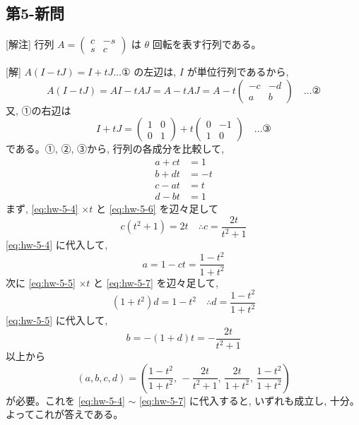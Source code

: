 \documentclass[../main.tex]{subfiles}
\begin{document}

\newpage

\subsection*{第5-新問}

[解注] 行列 $A =
\begin{pmatrix} c & -s \\ s & c
\end{pmatrix}$ は $\theta$ 回転を表す行列である。

[解] $A(I-tJ) = I+tJ \dots \text{①}$ の左辺は, $I$ が単位行列であるから,
\[
  A(I-tJ) = AI - tAJ = A - tAJ = A - t
  \begin{pmatrix} -c & -d \\ a & b
  \end{pmatrix} \quad \dots \text{②}
\]
又, ①の右辺は
\[
  I + tJ =
  \begin{pmatrix} 1 & 0 \\ 0 & 1
  \end{pmatrix} + t
  \begin{pmatrix} 0 & -1 \\ 1 & 0
  \end{pmatrix} \quad \dots \text{③}
\]
である。①, ②, ③から, 行列の各成分を比較して,
\begin{align}
  a + ct &= 1 \label{eq:hw-5-4} \\
  b + dt &= -t \label{eq:hw-5-5} \\
  c - at &= t \label{eq:hw-5-6} \\
  d - bt &= 1 \label{eq:hw-5-7}
\end{align}
まず, \eqref{eq:hw-5-4} $\times t$ と \eqref{eq:hw-5-6} を辺々足して
\[
  c(t^2+1) = 2t \quad \therefore c = \frac{2t}{t^2+1}
\]
\eqref{eq:hw-5-4} に代入して,
\[
  a = 1 - ct = \frac{1-t^2}{1+t^2}
\]
次に \eqref{eq:hw-5-5} $\times t$ と \eqref{eq:hw-5-7} を辺々足して,
\[
  (1+t^2)d = 1 - t^2 \quad \therefore d = \frac{1-t^2}{1+t^2}
\]
\eqref{eq:hw-5-5} に代入して,
\[
  b = -(1+d)t = -\frac{2t}{t^2+1}
\]
以上から
\[
  (a,b,c,d) = \left( \frac{1-t^2}{1+t^2}, \, -\frac{2t}{t^2+1}, \, \frac{2t}{1+t^2}, \, \frac{1-t^2}{1+t^2} \right)
\]
が必要。これを \eqref{eq:hw-5-4} $\sim$ \eqref{eq:hw-5-7} に代入すると, いずれも成立し, 十分。よってこれが答えである。
\end{document}
